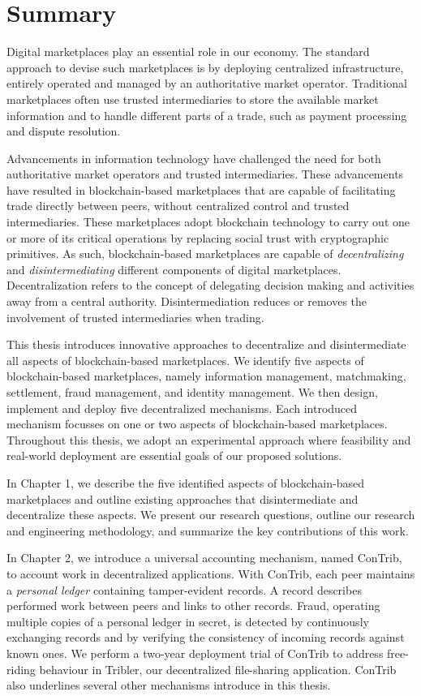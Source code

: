 \chapter*{Summary}

Digital marketplaces play an essential role in our economy.
The standard approach to devise such marketplaces is by deploying centralized infrastructure, entirely operated and managed by an authoritative market operator.
Traditional marketplaces often use trusted intermediaries to store the available market information and to handle different parts of a trade, such as payment processing and dispute resolution.

Advancements in information technology have challenged the need for both authoritative market operators and trusted intermediaries.
These advancements have resulted in blockchain-based marketplaces that are capable of facilitating trade directly between peers, without centralized control and trusted intermediaries.
These marketplaces adopt blockchain technology to carry out one or more of its critical operations by replacing social trust with cryptographic primitives.
As such, blockchain-based marketplaces are capable of \emph{decentralizing} and \emph{disintermediating} different components of digital marketplaces.
Decentralization refers to the concept of delegating decision making and activities away from a central authority.
Disintermediation reduces or removes the involvement of trusted intermediaries when trading.

This thesis introduces innovative approaches to decentralize and disintermediate all aspects of blockchain-based marketplaces.
We identify five aspects of blockchain-based marketplaces, namely information management, matchmaking, settlement, fraud management, and identity management.
We then design, implement and deploy five decentralized mechanisms.
Each introduced mechanism focusses on one or two aspects of blockchain-based marketplaces.
Throughout this thesis, we adopt an experimental approach where feasibility and real-world deployment are essential goals of our proposed solutions.

In Chapter 1, we describe the five identified aspects of blockchain-based marketplaces and outline existing approaches that disintermediate and decentralize these aspects.
We present our research questions, outline our research and engineering methodology, and summarize the key contributions of this work.

In Chapter 2, we introduce a universal accounting mechanism, named ConTrib, to account work in decentralized applications.
With ConTrib, each peer maintains a \emph{personal ledger} containing tamper-evident records.
A record describes performed work between peers and links to other records.
Fraud, operating multiple copies of a personal ledger in secret, is detected by continuously exchanging records and by verifying the consistency of incoming records against known ones.
We perform a two-year deployment trial of ConTrib to address free-riding behaviour in Tribler, our decentralized file-sharing application.
ConTrib also underlines several other mechanisms introduce in this thesis.

